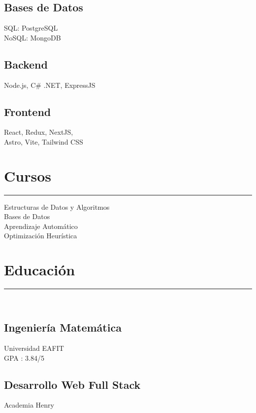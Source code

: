 \documentclass[]{rahulworld-resume}
\begin{document}
\begin{minipage}[t]{0.33\textwidth}
    \subsection{Bases de Datos}
    SQL: PostgreSQL\\
    NoSQL: MongoDB\\
    \vspace{1pt}
    \subsection{Backend}
    Node.js, C\# .NET, ExpressJS\\
    \subsection{Frontend}
    React, Redux, NextJS, \\
    Astro, Vite, Tailwind CSS\\

    \sectionsep
    \section{Cursos}
    \noindent\rule{5cm}{0.4pt}

    Estructuras de Datos y Algoritmos\\
    Bases de Datos\\
    Aprendizaje Automático\\
    Optimización Heurística\\
    \sectionsep
    \section{Educación}
    \noindent\rule{3cm}{0.4pt}\\
    \subsection{Ingeniería Matemática} Universidad EAFIT \\
    GPA : 3.84/5\\

    \subsection{Desarrollo Web Full Stack}
    Academia Henry


\end{minipage}
\end{document}
